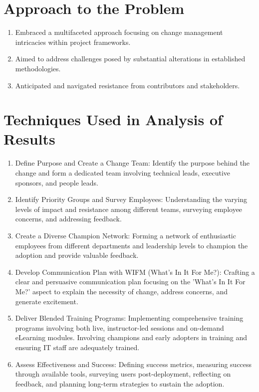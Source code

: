 \documentclass[11pt,letterpaper]{report}
\begin{document}
\section{Approach to the Problem}
\begin{enumerate}
\item Embraced a multifaceted approach focusing on change management intricacies within project frameworks.
\item Aimed to address challenges posed by substantial alterations in established methodologies.
\item Anticipated and navigated resistance from contributors and stakeholders.
\end{enumerate}

\section{Techniques Used in Analysis of Results}
\begin{enumerate}
    \item {Define Purpose and Create a Change Team:} Identify the purpose behind the change and form a dedicated team involving technical leads, executive sponsors, and people leads.
    \item {Identify Priority Groups and Survey Employees:} Understanding the varying levels of impact and resistance among different teams, surveying employee concerns, and addressing feedback.
    \item {Create a Diverse Champion Network:} Forming a network of enthusiastic employees from different departments and leadership levels to champion the adoption and provide valuable feedback.
    \item {Develop Communication Plan with WIFM (What's In It For Me?):} Crafting a clear and persuasive communication plan focusing on the 'What's In It For Me?' aspect to explain the necessity of change, address concerns, and generate excitement.
    \item {Deliver Blended Training Programs:} 
    Implementing comprehensive training programs involving both live, instructor-led sessions and on-demand eLearning modules. Involving champions and early adopters in training and ensuring IT staff are adequately trained.
    \item {Assess Effectiveness and Success:} Defining success metrics, measuring success through available tools, surveying users post-deployment, reflecting on feedback, and planning long-term strategies to sustain the adoption.
\end{enumerate}
\end{document}
